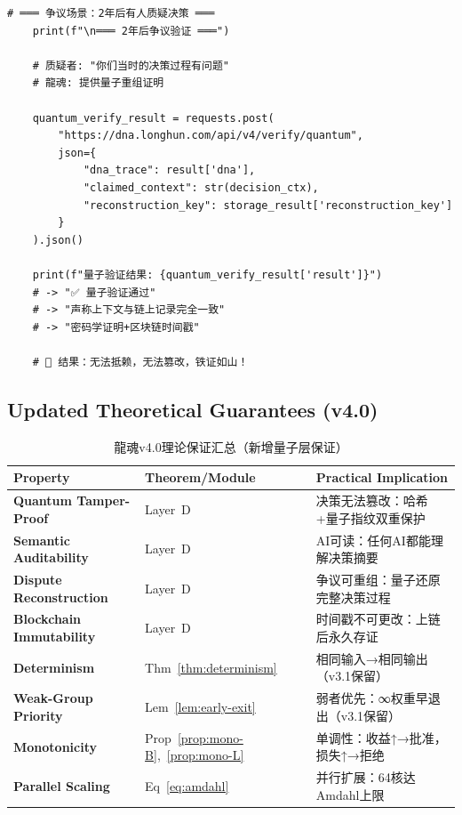 \begin{lstlisting}[style=python,
  caption={龍魂v4.0完整执行示例：气候危机场景
    · DNA: \#龍芯⚡️2026-03-10-COMPLETE-v4.0},
  label={lst:example-v4}]
    # ═══ 争议场景：2年后有人质疑决策 ═══
    print(f"\n═══ 2年后争议验证 ═══")
    
    # 质疑者: "你们当时的决策过程有问题"
    # 龍魂: 提供量子重组证明
    
    quantum_verify_result = requests.post(
        "https://dna.longhun.com/api/v4/verify/quantum",
        json={
            "dna_trace": result['dna'],
            "claimed_context": str(decision_ctx),
            "reconstruction_key": storage_result['reconstruction_key']
        }
    ).json()
    
    print(f"量子验证结果: {quantum_verify_result['result']}")
    # -> "✅ 量子验证通过"
    # -> "声称上下文与链上记录完全一致"
    # -> "密码学证明+区块链时间戳"
    
    # 🎯 结果：无法抵赖，无法篡改，铁证如山！
\end{lstlisting}


\subsection{Updated Theoretical Guarantees (v4.0)}

\begin{table}[H]
\centering
\caption{龍魂v4.0理论保证汇总（新增量子层保证）}
\label{tab:guarantees-v4}
\renewcommand{\arraystretch}{1.4}
\begin{tabular}{p{3.2cm}p{3.0cm}p{5.5cm}}
\toprule
\textbf{Property}
  & \textbf{Theorem/Module}
  & \textbf{Practical Implication} \\
\midrule
\rowcolor{quantumPurple!8}
\textbf{Quantum Tamper-Proof}
  & Layer~D
  & 决策无法篡改：哈希+量子指纹双重保护 \\
\rowcolor{quantumPurple!8}
\textbf{Semantic Auditability}
  & Layer~D
  & AI可读：任何AI都能理解决策摘要 \\
\rowcolor{quantumPurple!8}
\textbf{Dispute Reconstruction}
  & Layer~D
  & 争议可重组：量子还原完整决策过程 \\
\rowcolor{quantumPurple!8}
\textbf{Blockchain Immutability}
  & Layer~D
  & 时间戳不可更改：上链后永久存证 \\
\textbf{Determinism}
  & Thm~\ref{thm:determinism}
  & 相同输入→相同输出（v3.1保留） \\
\textbf{Weak-Group Priority}
  & Lem~\ref{lem:early-exit}
  & 弱者优先：∞权重早退出（v3.1保留） \\
\textbf{Monotonicity}
  & Prop~\ref{prop:mono-B},~\ref{prop:mono-L}
  & 单调性：收益↑→批准，损失↑→拒绝 \\
\textbf{Parallel Scaling}
  & Eq~\ref{eq:amdahl}
  & 并行扩展：64核达Amdahl上限 \\
\bottomrule
\end{tabular}
\end{table}


